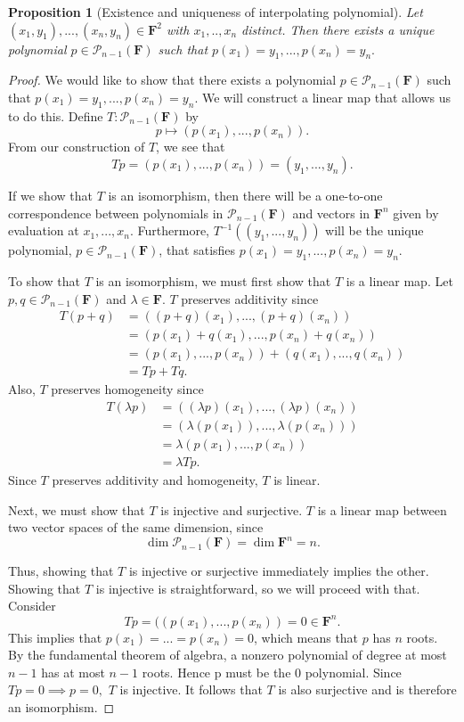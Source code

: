 \documentclass{article}
\numberwithin{equation}{section}
\newtheorem{proposition}[equation]{Proposition}
\begin{document}
\begin{proposition}[Existence and uniqueness of interpolating polynomial]
Let $(x_1,y_1),...,(x_n,y_n) \in \mathbf{F}^2$ with $x_1,..,x_n$ distinct. Then there exists a unique polynomial $p \in \mathcal{P}_{n-1}(\mathbf{F})$ such that $p(x_1)=y_1,...,p(x_n)=y_n.$
\end{proposition}
\begin{proof}
We would like to show that there exists a polynomial $p\in\mathcal{P}_{n-1}(\mathbf{F})$ such that $p(x_1)=y_1,...,p(x_n)=y_n.$ We will construct a linear map that allows us to do this. Define $T: \mathcal{P}_{n-1}(\mathbf{F})$ by $$p \mapsto (p(x_1),...,p(x_n)).$$
From our construction of $T$, we see that $$Tp = (p(x_1),...,p(x_n)) = (y_1,...,y_n).$$

If we show that $T$ is an isomorphism, then there will be a one-to-one correspondence between polynomials in $\mathcal{P}_{n-1}(\mathbf{F})$ and vectors in $\mathbf{F}^n$ given by evaluation at $x_1,...,x_n.$ Furthermore, $T^{-1}((y_1,...,y_n))$ will be the unique polynomial, $p \in \mathcal{P}_{n-1}(\mathbf{F})$, that satisfies $p(x_1)=y_1,...,p(x_n)=y_n.$

To show that $T$ is an isomorphism, we must first show that $T$ is a linear map. Let $p,q \in \mathcal{P}_{n-1}(\mathbf{F})$ and $\lambda \in \mathbf{F}$. $T$ preserves additivity since
\begin{align*}
T(p+q) &= ((p+q)(x_1),...,(p+q)(x_n)) \\
       &= (p(x_1) + q(x_1),...,p(x_n) + q(x_n)) \\
       &= (p(x_1),...,p(x_n)) + (q(x_1),...,q(x_n)) \\
       &= Tp + Tq.
\end{align*}
Also, $T$ preserves homogeneity since
\begin{align*}
T(\lambda p) &= ((\lambda p)(x_1),...,(\lambda p)(x_n)) \\
             &= (\lambda(p(x_1)),...,\lambda (p(x_n))) \\
             &= \lambda(p(x_1),...,p(x_n)) \\
             &= \lambda Tp.
\end{align*}
Since $T$ preserves additivity and homogeneity, $T$ is linear.

Next, we must show that $T$ is injective and surjective. $T$ is a linear map between two vector spaces of the same dimension, since $$\dim \mathcal{P}_{n-1}(\mathbf{F})=\dim\mathbf{F}^n = n.$$

Thus, showing that $T$ is injective or surjective immediately implies the other. Showing that $T$ is injective is straightforward, so we will proceed with that. Consider $$Tp = ((p(x_1),...,p(x_n)) = 0 \in \mathbf{F}^n.$$ This implies that $p(x_1)=...=p(x_n)=0$, which means that $p$ has $n$ roots. By the fundamental theorem of algebra, a nonzero polynomial of degree at most $n-1$ has at most $n-1$ roots. Hence p must be the $0$ polynomial. Since $Tp=0 \implies p=0,$ $T$ is injective. It follows that $T$ is also surjective and is therefore an isomorphism.


\end{proof}
\end{document}
